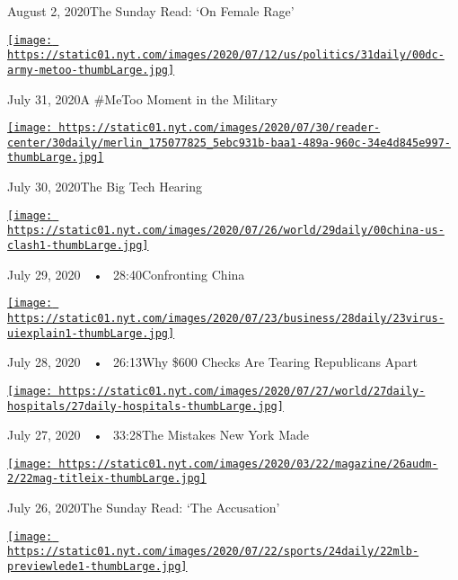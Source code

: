 August 2, 2020The Sunday Read: `On Female Rage'

\href{https://www.nytimes.com/2020/07/31/podcasts/the-daily/vanessa-guillen-military-metoo.html?action=click\&module=audio-series-bar\&region=header\&pgtype=Article}{\texttt{[image: https://static01.nyt.com/images/2020/07/12/us/politics/31daily/00dc-army-metoo-thumbLarge.jpg]}}

July 31, 2020A \#MeToo Moment in the Military

\href{https://www.nytimes.com/2020/07/30/podcasts/the-daily/congress-facebook-amazon-google-apple.html?action=click\&module=audio-series-bar\&region=header\&pgtype=Article}{\texttt{[image: https://static01.nyt.com/images/2020/07/30/reader-center/30daily/merlin\_175077825\_5ebc931b-baa1-489a-960c-34e4d845e997-thumbLarge.jpg]}}

July 30, 2020The Big Tech Hearing

\href{https://www.nytimes.com/2020/07/29/podcasts/the-daily/china-trump-foreign-policy.html?action=click\&module=audio-series-bar\&region=header\&pgtype=Article}{\texttt{[image: https://static01.nyt.com/images/2020/07/26/world/29daily/00china-us-clash1-thumbLarge.jpg]}}

July 29, 2020~~•~ 28:40Confronting China

\href{https://www.nytimes.com/2020/07/28/podcasts/the-daily/unemployment-benefits-coronavirus.html?action=click\&module=audio-series-bar\&region=header\&pgtype=Article}{\texttt{[image: https://static01.nyt.com/images/2020/07/23/business/28daily/23virus-uiexplain1-thumbLarge.jpg]}}

July 28, 2020~~•~ 26:13Why \$600 Checks Are Tearing Republicans Apart

\href{https://www.nytimes.com/2020/07/27/podcasts/the-daily/new-york-hospitals-covid.html?action=click\&module=audio-series-bar\&region=header\&pgtype=Article}{\texttt{[image: https://static01.nyt.com/images/2020/07/27/world/27daily-hospitals/27daily-hospitals-thumbLarge.jpg]}}

July 27, 2020~~•~ 33:28The Mistakes New York Made

\href{https://www.nytimes.com/2020/07/26/podcasts/the-daily/the-accusation-the-sunday-read.html?action=click\&module=audio-series-bar\&region=header\&pgtype=Article}{\texttt{[image: https://static01.nyt.com/images/2020/03/22/magazine/26audm-2/22mag-titleix-thumbLarge.jpg]}}

July 26, 2020The Sunday Read: `The Accusation'

\href{https://www.nytimes.com/2020/07/24/podcasts/the-daily/mlb-baseball-season-coronavirus.html?action=click\&module=audio-series-bar\&region=header\&pgtype=Article}{\texttt{[image: https://static01.nyt.com/images/2020/07/22/sports/24daily/22mlb-previewlede1-thumbLarge.jpg]}}

